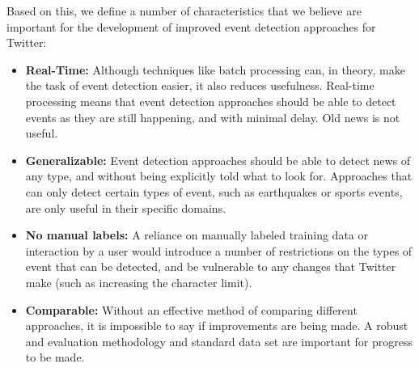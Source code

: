 Based on this, we define a number of characteristics that we believe are important for the development of improved event detection approaches for Twitter:
\begin{itemize}

	\item \textbf{Real-Time:} Although techniques like batch processing can, in theory, make the task of event detection easier, it also reduces usefulness.
	Real-time processing means that event detection approaches should be able to detect events as they are still happening, and with minimal delay.
	Old news is not useful. \\

	\item \textbf{Generalizable:} Event detection approaches should be able to detect news of any type, and without being explicitly told what to look for. Approaches that can only detect certain types of event, such as earthquakes or sports events, are only useful in their specific domains. \\

	\item \textbf{No manual labels:} A reliance on manually labeled training data or interaction by a user would introduce a number of restrictions on the types of event that can be detected, and be vulnerable to any changes that Twitter make (such as increasing the character limit). \\

	\item \textbf{Comparable:} Without an effective method of comparing different approaches, it is impossible to say if improvements are being made. A robust and  evaluation methodology and standard data set are important for progress to be made.  \\

\end{itemize}

